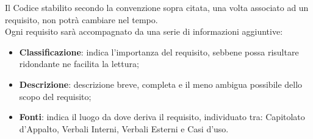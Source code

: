 				Il Codice stabilito secondo la convenzione sopra citata, una volta associato ad un requisito, non potrà cambiare nel tempo. \\
				Ogni requisito sarà accompagnato da una serie di informazioni aggiuntive:\\
				\begin{itemize}
					\item\textbf{Classificazione}: indica l’importanza del requisito, sebbene possa risultare ridondante ne facilita la lettura;
					\item\textbf{Descrizione}: descrizione breve, completa e il meno ambigua possibile dello scopo del requisito;
					\item\textbf{Fonti}: indica il luogo da dove deriva il requisito, individuato tra: Capitolato d’Appalto, Verbali Interni, Verbali Esterni e Casi d’uso.
				\end{itemize}
